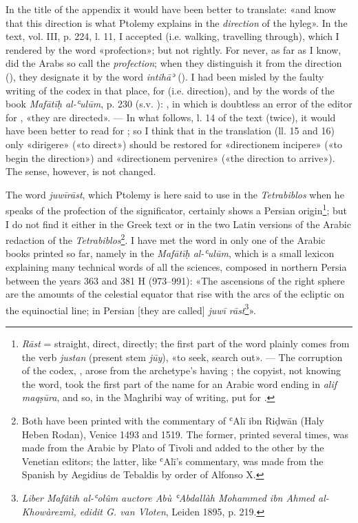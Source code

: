 \documentclass[11pt]{article}
\begin{document}
\par In the title of the appendix it would have been better to translate: «and know that this direction is what Ptolemy explains in the \emph{direction} of the hyleg». In the text, vol. III, p. 224, l. 11, I accepted  (i.e. walking, travelling through), which I rendered by the word «profection»; but not rightly. For never, as far as I know, did the Arabs so call the \emph{profection}; when they distinguish it from the direction (), they designate it by the word \emph{intihāʾ} (). I had been misled by the faulty writing of the codex in that place,  for  (i.e. direction), and by the words of the book \emph{Mafātīḥ al-ʿulūm}, p. 230 (s.v. ): , in which  is doubtless an error of the editor for , «they are directed». — In what follows, l. 14 of the text (twice), it would have been better to read  for ; so I think that in the translation (ll. 15 and 16) only «dirigere» («to direct») should be restored for «directionem incipere» («to begin the direction») and «directionem pervenire» («the direction to arrive»). The sense, however, is not changed.\par
\par The word \emph{juwīrāst}, which Ptolemy is here said to use in the \emph{Tetrabiblos} when he speaks of the profection of the significator, certainly shows a Persian origin\footnote{\emph{Rāst} = straight, direct, directly; the first part of the word plainly comes from the verb \emph{justan} (present stem \emph{jūy}), «to seek, search out». — The corruption of the codex, , arose from the archetype's having ; the copyist, not knowing the word, took the first part of the name for an Arabic word ending in \emph{alif maqṣūra}, and so, in the Maghribi way of writing, put  for .}; but I do not find it either in the Greek text or in the two Latin versions of the Arabic redaction of the \emph{Tetrabiblos}\footnote{Both have been printed with the commentary of ʿAlī ibn Riḍwān (Haly Heben Rodan), Venice 1493 and 1519. The former, printed several times, was made from the Arabic by Plato of Tivoli and added to the other by the Venetian editors; the latter, like ʿAlī's commentary, was made from the Spanish by Aegidius de Tebaldis by order of Alfonso X.}. I have met the word in only one of the Arabic books printed so far, namely in the \emph{Mafātīḥ al-ʿulūm}, which is a small lexicon explaining many technical words of all the sciences, composed in northern Persia between the years 363 and 381 H (973–991): «The ascensions of the right sphere are the amounts of the celestial equator that rise with the arcs of the ecliptic on the equinoctial line; in Persian [they are called] \emph{juwī rāst}\footnote{\emph{Liber Mafâtih al-ʿolûm auctore Abù ʿAbdallàh Mohammed ibn Ahmed al-Khowàrezmì, edidit G. van Vloten}, Leiden 1895, p. 219.}».\par
\end{document}
